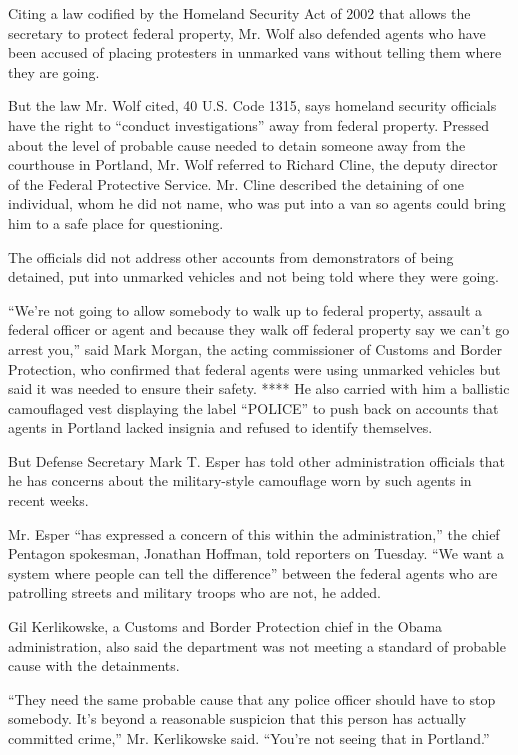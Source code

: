 Citing a law codified by the Homeland Security Act of 2002 that allows
the secretary to protect federal property, Mr. Wolf also defended agents
who have been accused of placing protesters in unmarked vans without
telling them where they are going.

But the law Mr. Wolf cited, 40 U.S. Code 1315, says homeland security
officials have the right to ``conduct investigations'' away from federal
property. Pressed about the level of probable cause needed to detain
someone away from the courthouse in Portland, Mr. Wolf referred to
Richard Cline, the deputy director of the Federal Protective Service.
Mr. Cline described the detaining of one individual, whom he did not
name, who was put into a van so agents could bring him to a safe place
for questioning.

The officials did not address other accounts from demonstrators of being
detained, put into unmarked vehicles and not being told where they were
going.

``We're not going to allow somebody to walk up to federal property,
assault a federal officer or agent and because they walk off federal
property say we can't go arrest you,'' said Mark Morgan, the acting
commissioner of Customs and Border Protection, who confirmed that
federal agents were using unmarked vehicles but said it was needed to
ensure their safety. **** He also carried with him a ballistic
camouflaged vest displaying the label ``POLICE'' to push back on
accounts that agents in Portland lacked insignia and refused to identify
themselves.

But Defense Secretary Mark T. Esper has told other administration
officials that he has concerns about the military-style camouflage worn
by such agents in recent weeks.

Mr. Esper ``has expressed a concern of this within the administration,''
the chief Pentagon spokesman, Jonathan Hoffman, told reporters on
Tuesday. ``We want a system where people can tell the difference''
between the federal agents who are patrolling streets and military
troops who are not, he added.

Gil Kerlikowske, a Customs and Border Protection chief in the Obama
administration, also said the department was not meeting a standard of
probable cause with the detainments.

``They need the same probable cause that any police officer should have
to stop somebody. It's beyond a reasonable suspicion that this person
has actually committed crime,'' Mr. Kerlikowske said. ``You're not
seeing that in Portland.''

